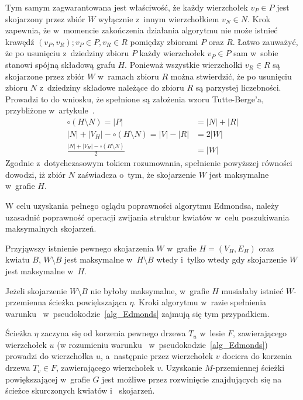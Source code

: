 {\begin{bproof}
    Tym samym zagwarantowana jest właściwość, że każdy wierzchołek $v_P \in P$ jest skojarzony przez zbiór $W$ wyłącznie z~innym wierzchołkiem $v_N \in N$.
    Krok~ zapewnia, że w~momencie zakończenia działania algorytmu nie może istnieć krawędź $(v_P, v_R); v_P \in P, v_R \in R$ pomiędzy zbiorami $P$ oraz $R$.
    Łatwo zauważyć, że po usunięciu z~dziedziny zbioru $P$ każdy wierzchołek $v_P \in P$ sam w~sobie stanowi spójną składową grafu $H$.
    Ponieważ wszystkie wierzchołki $v_R \in R$ są skojarzone przez zbiór $W$ w~ramach zbioru $R$ można stwierdzić, że po usunięciu zbioru $N$ z~dziedziny składowe należące do zbioru $R$ są parzystej liczebności.
    Prowadzi to do wniosku, że spełnione są założenia wzoru Tutte-Berge'a, przybliżone w~artykule~\cite{cohen:hal-00358468}.
    \begin{align*}
        \circ(H \setminus N) = |P| &= |N| + |R|\\
        |N| + |V_H| - \circ(H \setminus N) = |V| - |R| &= 2|W|\\
        \frac{|N| + |V_H| - \circ (H \setminus N)}{2} &= |W|
    \end{align*}
    Zgodnie z~dotychczasowym tokiem rozumowania, spełnienie powyższej równości dowodzi, iż zbiór $N$ zaświadcza o~tym, że skojarzenie $W$ jest maksymalne w~grafie $H$.
  \end{bproof}
  W celu uzyskania pełnego oglądu poprawności algorytmu Edmondsa, należy uzasadnić poprawność operacji zwijania struktur kwiatów w~celu poszukiwania maksymalnych skojarzeń.
  \begin{theorem}
    Przyjąwszy istnienie pewnego skojarzenia $W$ w~grafie $H=(V_H, E_H)$ oraz kwiatu $B$, $W \setminus B$ jest maksymalne w~$H \setminus B$ wtedy i~tylko wtedy gdy skojarzenie $W$ jest maksymalne w~$H$.
  \end{theorem}
  \begin{bproof}
    Jeżeli skojarzenie $W \setminus B$ nie byłoby maksymalne, w~grafie $H$ musiałaby istnieć $W$-przemienna ścieżka powiększająca $\eta$.
    Kroki algorytmu w~razie spełnienia warunku~ w~pseudokodzie~\ref{alg_Edmonds} zajmują się tym przypadkiem.

    Ścieżka $\eta$ zaczyna się od korzenia pewnego drzewa $T_u$ w~lesie $F$, zawierającego wierzchołek $u$ (w rozumieniu warunku~ w~pseudokodzie~\ref{alg_Edmonds}) prowadzi do wierzchołka $u$, a~następnie przez wierzchołek $v$ dociera do korzenia drzewa $T_v \in F$, zawierającego wierzchołek $v$.
    Uzyskanie $M$-przemiennej ścieżki powiększającej w~grafie $G$ jest możliwe przez rozwinięcie znajdujących się na ścieżce skurczonych kwiatów i~
    skojarzeń.


\end{bproof}}
